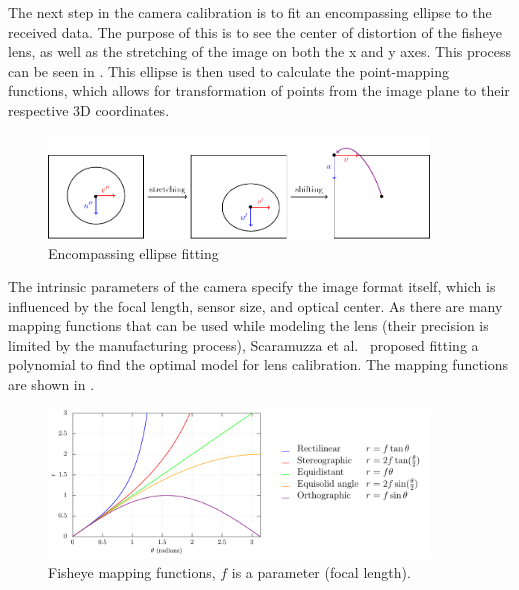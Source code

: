 The next step in the camera calibration is to fit an encompassing ellipse to the received data. The purpose of this is to see the center of distortion of the fisheye lens, as well
as the stretching of the image on both the x and y axes. This process can be seen in . This ellipse is then used to calculate the point-mapping functions, which allows for transformation of points from
the image plane to their respective 3D coordinates.
\begin{figure}[H]
	\centering
	\includegraphics[width=0.9\textwidth]{./fig/tikz/ellipse.pdf}
	\caption{Encompassing ellipse fitting \cite{scaramuzzacalibration}}
	\label{fig:ellipse}
  \end{figure}
The intrinsic parameters of the camera specify the image format itself, which is influenced by the focal length, sensor size, and optical center. As there are many mapping
functions that can be used while modeling the lens (their precision is limited by the manufacturing process), Scaramuzza et al.~\cite{scaramuzzacalibration} proposed
fitting a polynomial to find the optimal model for lens calibration. The mapping functions are shown in .
\begin{figure}[H]
  \centering
  \includegraphics[width=0.9\textwidth]{./fig/tikz/mapping.pdf}
  \caption{Fisheye mapping functions, $f$ is a parameter (focal length).}
  \label{fig:mapping_functions}
\end{figure}

